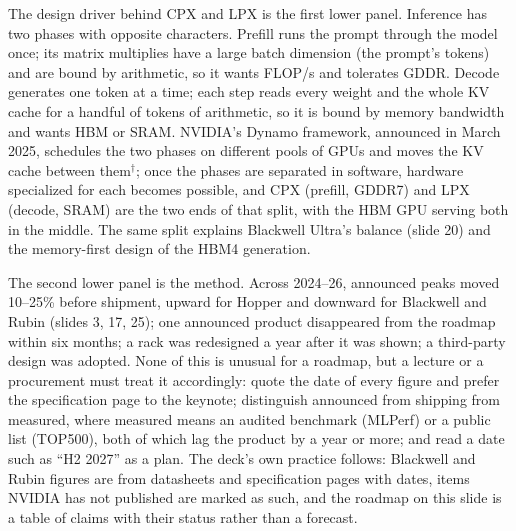 \documentclass[11pt,letterpaper]{article}
\begin{document}
The design driver behind CPX and LPX is the first lower panel. Inference has two phases with opposite characters. Prefill runs the prompt through the model once; its matrix multiplies have a large batch dimension (the prompt's tokens) and are bound by arithmetic, so it wants FLOP/s and tolerates GDDR. Decode generates one token at a time; each step reads every weight and the whole KV cache for a handful of tokens of arithmetic, so it is bound by memory bandwidth and wants HBM or SRAM. NVIDIA's Dynamo framework, announced in March 2025, schedules the two phases on different pools of GPUs and moves the KV cache between them$^\dagger$; once the phases are separated in software, hardware specialized for each becomes possible, and CPX (prefill, GDDR7) and LPX (decode, SRAM) are the two ends of that split, with the HBM GPU serving both in the middle. The same split explains Blackwell Ultra's balance (slide 20) and the memory-first design of the HBM4 generation.

The second lower panel is the method. Across 2024--26, announced peaks moved 10--25\% before shipment, upward for Hopper and downward for Blackwell and Rubin (slides 3, 17, 25); one announced product disappeared from the roadmap within six months; a rack was redesigned a year after it was shown; a third-party design was adopted. None of this is unusual for a roadmap, but a lecture or a procurement must treat it accordingly: quote the date of every figure and prefer the specification page to the keynote; distinguish announced from shipping from measured, where measured means an audited benchmark (MLPerf) or a public list (TOP500), both of which lag the product by a year or more; and read a date such as ``H2 2027'' as a plan. The deck's own practice follows: Blackwell and Rubin figures are from datasheets and specification pages with dates, items NVIDIA has not published are marked as such, and the roadmap on this slide is a table of claims with their status rather than a forecast.
\end{document}
